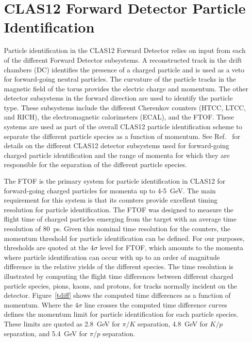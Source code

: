 \documentclass{elsart}
\begin{document}
\section{CLAS12 Forward Detector Particle Identification}
\label{clas12-fd-pid}

Particle identification in the CLAS12 Forward Detector relies on input from each of the different
Forward Detector subsystems. A reconstructed track in the drift chambers (DC) identifies the
presence of a charged particle and is used as a veto for forward-going neutral particles. The curvature
of the particle tracks in the magnetic field of the torus provides the electric charge and momentum.
The other detector subsystems in the forward direction are used to identify the particle type. These
subsystems include the different Cherenkov counters (HTCC, LTCC, and RICH), the electromagnetic
calorimeters (ECAL), and the FTOF. These systems are used as part of the overall CLAS12 particle
identification scheme to separate the different particle species as a function of momentum. See
Ref.~\cite{clas12-overview} for details on the different CLAS12 detector subsystems used for
forward-going charged particle identification and the range of momenta for which they are responsible
for the separation of the different particle species.

The FTOF is the primary system for particle identification in CLAS12 for forward-going charged particles
for momenta up to 4-5~GeV. The main requirement for this system is that its counters provide excellent
timing resolution for particle identification. The FTOF  was designed to measure the flight time of charged
particles emerging from the target with an average time resolution of 80~ps. Given this nominal time resolution
for the counters, the momentum threshold for particle identification can be defined. For our purposes, thresholds
are quoted at the 4$\sigma$ level for FTOF, which amounts to the momenta where particle identification can occur
with up to an order of magnitude difference in the relative yields of the different species. The time resolution is
illustrated by computing the flight time differences between different charged particle species, pions, kaons, and
protons, for tracks normally incident on the detector. Figure~\ref{tdiff} shows the computed time differences as
a function of momentum. Where the 4$\sigma$ line crosses the computed time difference curves defines the
momentum limit for particle identification for each particle species. These limits are quoted as 2.8~GeV for
$\pi/K$ separation, 4.8~GeV for $K/p$ separation, and 5.4~GeV for $\pi/p$ separation.  
\end{document}
